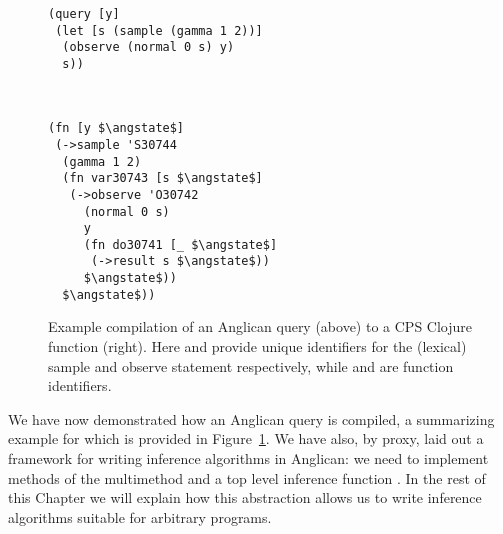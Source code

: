 \begin{figure}[t]
	\centering
	\begin{minipage}[t]{0.55\textwidth}
		\centering	
		\begin{lstlisting}[basicstyle=\ttfamily\footnotesize]
(query [y]
 (let [s (sample (gamma 1 2))]
  (observe (normal 0 s) y)
  s))
		\end{lstlisting}
		\vspace{-7pt}
\caption{Example compilation of an Anglican query (above) to a
	CPS Clojure function (right).
	Here  and  provide unique identifiers
	for the (lexical) sample and observe statement respectively, while
	 and  are function identifiers. 
				\label{fig:proginf:comp}}
	\end{minipage}
	~~
	\begin{minipage}[t]{0.42\textwidth}
		\centering	
		\begin{lstlisting}[basicstyle=\ttfamily\footnotesize]
(fn [y $\angstate$]
 (->sample 'S30744
  (gamma 1 2) 
  (fn var30743 [s $\angstate$] 
   (->observe 'O30742
     (normal 0 s) 
     y
     (fn do30741 [_ $\angstate$] 
      (->result s $\angstate$)) 
     $\angstate$)) 
  $\angstate$))
		\end{lstlisting}	
	\end{minipage}
\end{figure}

We have now demonstrated how an Anglican query is compiled, a summarizing example for which
is provided in Figure~\ref{fig:proginf:comp}.  We have also, by proxy, laid out a framework for
writing inference algorithms in Anglican: we need to implement methods of the \checkpoint multimethod
and a top level inference function \anginfer.  
In the rest of this Chapter we will
explain how this abstraction allows us to write inference algorithms suitable for arbitrary programs.